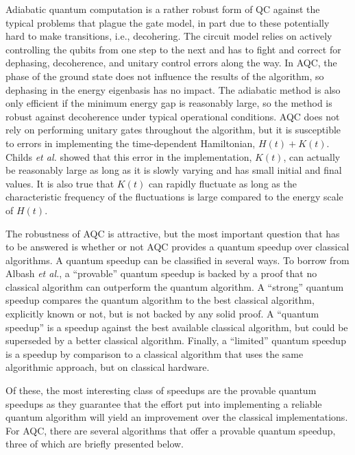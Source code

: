 \documentclass[%
 reprint,
 amsmath,amssymb,
 aps,
]{revtex4-1}
\begin{document}
   Adiabatic quantum computation is a rather robust form of QC against the typical problems that plague the gate model, in part due to these potentially hard to make transitions, i.e., decohering. The circuit model relies on actively controlling the qubits from one step to the next and has to fight and correct for dephasing, decoherence, and unitary control errors along the way. In AQC, the phase of the ground state does not influence the results of the algorithm, so dephasing in the energy eigenbasis has no impact. The adiabatic method is also only efficient if the minimum energy gap is reasonably large, so the method is robust against decoherence under typical operational conditions\cite{Childs2001}. AQC does not rely on performing unitary gates throughout the algorithm, but it is susceptible to errors in implementing the time-dependent Hamiltonian, $H(t) + K(t)$. Childs \textit{et al.} showed that this error in the implementation, $K(t)$, can actually be reasonably large as long as it is slowly varying and has small initial and final values. It is also true that $K(t)$ can rapidly fluctuate as long as the characteristic frequency of the fluctuations is large compared to the energy scale of $H(t)$.
   
   The robustness of AQC is attractive, but the most important question that has to be answered is whether or not AQC provides a quantum speedup over classical algorithms. A quantum speedup can be classified in several ways\cite{RevModPhys.90.015002}. To borrow from Albash \textit{et al.}, a ``provable'' quantum speedup is backed by a proof that no classical algorithm can outperform the quantum algorithm. A ``strong'' quantum speedup compares the quantum algorithm to the best classical algorithm, explicitly known or not, but is not backed by any solid proof. A ``quantum speedup'' is a speedup against the best available classical algorithm, but could be superseded by a better classical algorithm. Finally, a ``limited'' quantum speedup is a speedup by comparison to a classical algorithm that uses the same algorithmic approach, but on classical hardware.
   
   Of these, the most interesting class of speedups are the provable quantum speedups as they guarantee that the effort put into implementing a reliable quantum algorithm will yield an improvement over the classical implementations. For AQC, there are several algorithms that offer a provable quantum speedup, three of which are briefly presented below.
   
\end{document}
